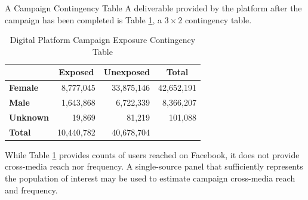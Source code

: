 \documentclass[pdf]{beamer}
\theoremstyle{remark}
\theoremstyle{definition}
\begin{document}
\begin{frame}[t]{A Campaign Contingency Table}
A deliverable provided by the platform after the campaign has been completed is Table \ref{tab:adcampct}, a $3 \times 2$ contingency table.   \\
\vspace{2.5ex}
\begin{table}[htbp]
  \centering
  \captionsetup{justification=centering}
    \begin{tabular}{|l|r|r|r}
\cmidrule{2-4}    \multicolumn{1}{r|}{} & \multicolumn{1}{c|}{\cellcolor[rgb]{ .851,  .882,  .949}\textbf{Exposed}} & \multicolumn{1}{c|}{\cellcolor[rgb]{ .851,  .882,  .949}\textbf{Unexposed}} & \multicolumn{1}{c|}{\cellcolor[rgb]{ .851,  .882,  .949}\textbf{Total}} \\
    \midrule
    \rowcolor[rgb]{ .851,  .882,  .949} \textbf{Female} & \cellcolor[rgb]{ 1,  1,  1}8,777,045 & \cellcolor[rgb]{ 1,  1,  1}33,875,146 & \multicolumn{1}{r|}{\cellcolor[rgb]{ 1,  1,  1}42,652,191} \\
    \rowcolor[rgb]{ .851,  .882,  .949} \textbf{Male} & \cellcolor[rgb]{ 1,  1,  1}1,643,868 & \cellcolor[rgb]{ 1,  1,  1}6,722,339 & \multicolumn{1}{r|}{\cellcolor[rgb]{ 1,  1,  1}8,366,207} \\
    \rowcolor[rgb]{ .851,  .882,  .949} \textbf{Unknown} & \cellcolor[rgb]{ 1,  1,  1}19,869 & \cellcolor[rgb]{ 1,  1,  1}81,219 & \multicolumn{1}{r|}{\cellcolor[rgb]{ 1,  1,  1}101,088} \\
    \midrule
    \rowcolor[rgb]{ .851,  .882,  .949} \textbf{Total} & \cellcolor[rgb]{ 1,  1,  1}10,440,782 & \cellcolor[rgb]{ 1,  1,  1}40,678,704 & \cellcolor[rgb]{ 1,  1,  1} \\
\cmidrule{1-3}    \end{tabular}%
  \caption{Digital Platform Campaign Exposure Contingency Table}
  \label{tab:adcampct}%
\end{table}%
\vspace{-2.0ex}
While Table \ref{tab:adcampct} provides counts of users reached on Facebook, it does not provide cross-media reach nor frequency.  A single-source panel that sufficiently represents the population of interest may be used to estimate campaign cross-media reach and frequency. 
\end{frame}
\end{document}
